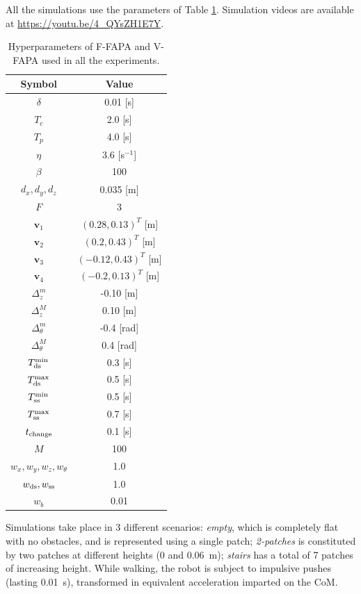 All the simulations use the parameters of Table \ref{tab:FAPA:hyperparameters}.
Simulation videos are available at \url{https://youtu.be/4_QYsZH1E7Y}.

\begin{table}
    \centering
    \begin{tabular}{ |c|c| } 
        \hline
        Symbol & Value \\
        \hline
        $\delta$ & 0.01 [s] \\
        $T_c$ & 2.0 [s] \\
        $T_p$ & 4.0 [s] \\
        $\eta$ & 3.6 [s$^{-1}$] \\
        $\beta$ & 100 \\
        $d_x, d_y, d_z$ & 0.035 [m] \\
        $F$ & 3 \\
        $\bm{v}_1$ & $(0.28, 0.13)^T $ [m] \\
        $\bm{v}_2$ & $(0.2, 0.43)^T$ [m] \\
        $\bm{v}_3$ & $(-0.12, 0.43)^T$ [m] \\
        $\bm{v}_4$ & $(-0.2, 0.13)^T$ [m] \\
        $\Delta_z^m$ & -0.10 [m] \\
        $\Delta_z^M$ & 0.10 [m] \\
        $\Delta_{\theta}^m$ & -0.4 [rad] \\
        $\Delta_{\theta}^M$ & 0.4 [rad] \\
        $T_{\rm ds}^{\min}$ & 0.3 [s] \\
        $T_{\rm ds}^{\max}$ & 0.5 [s] \\
        $T_{\rm ss}^{\min}$ & 0.5 [s] \\
        $T_{\rm ss}^{\max}$ & 0.7 [s] \\
        $t_{\rm change}$ & 0.1 [s] \\
        $M$ & 100 \\
        $w_x, w_y, w_z, w_{\theta}$ & 1.0 \\
        $w_{\rm ds}, w_{\rm ss}$ & 1.0 \\
        $w_b$ & 0.01 \\
        \hline
    \end{tabular}
    \caption{Hyperparameters of F-FAPA and V-FAPA used in all the experiments.}
    \label{tab:FAPA:hyperparameters}
\end{table}

Simulations take place in 3 different scenarios: {\em empty}, which is
completely flat with no obstacles, and is represented using a single patch;
{\em 2-patches} is constituted by two patches at different heights
(0 and 0.06~m); {\em stairs} has a total of 7 patches of increasing height.
While walking, the robot is subject to impulsive pushes (lasting 0.01~s),
transformed in equivalent acceleration imparted on the CoM.

